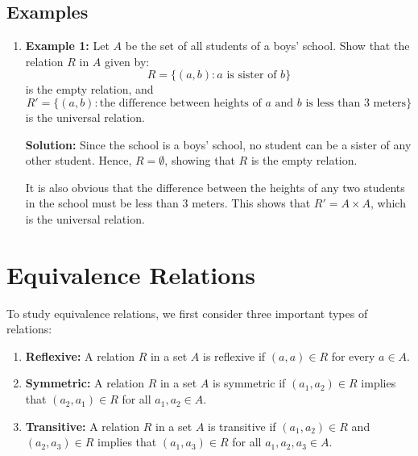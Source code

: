 \documentclass[11pt]{article}
\newcommand{\solution}{\noindent \textbf{Solution: }}
\begin{document}
\subsection{Examples}
\begin{enumerate}
    \item \textbf{Example 1:} Let \( A \) be the set of all students of a boys' school. Show that the relation \( R \) in \( A \) given by:
    \[
    R = \{(a, b) : a \text{ is sister of } b\}
    \]
    is the empty relation, and
    \[
    R' = \{(a, b) : \text{the difference between heights of } a \text{ and } b \text{ is less than 3 meters}\}
    \]
    is the universal relation.
    
    \solution Since the school is a boys' school, no student can be a sister of any other student. Hence, \( R = \emptyset \), showing that \( R \) is the empty relation. 
    
    It is also obvious that the difference between the heights of any two students in the school must be less than 3 meters. This shows that \( R' = A \times A \), which is the universal relation.
\end{enumerate}

\section{Equivalence Relations}
To study equivalence relations, we first consider three important types of relations:

\begin{enumerate}
    \item \textbf{Reflexive:} A relation \( R \) in a set \( A \) is reflexive if \( (a, a) \in R \) for every \( a \in A \).
    \item \textbf{Symmetric:} A relation \( R \) in a set \( A \) is symmetric if \( (a_1, a_2) \in R \) implies that \( (a_2, a_1) \in R \) for all \( a_1, a_2 \in A \).
    \item \textbf{Transitive:} A relation \( R \) in a set \( A \) is transitive if \( (a_1, a_2) \in R \) and \( (a_2, a_3) \in R \) implies that \( (a_1, a_3) \in R \) for all \( a_1, a_2, a_3 \in A \).
\end{enumerate}
\end{document}
